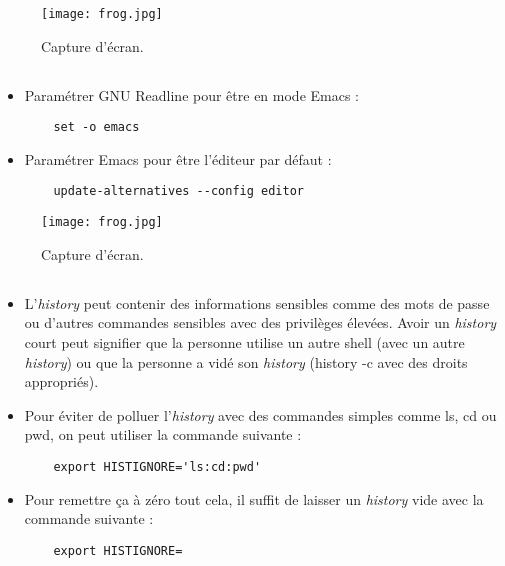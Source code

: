 \documentclass{article}
\begin{document}
\begin{figure}[h]
\centering
\texttt{[image: frog.jpg]}
\caption{\label{fig:frog}Capture d'écran.}
\end{figure}

\subsection{}

\begin{itemize}
    \item Paramétrer GNU Readline pour être en mode Emacs :
    \begin{lstlisting}
    set -o emacs
    \end{lstlisting}
    \item Paramétrer Emacs pour être l’éditeur par défaut :
    \begin{lstlisting}
    update-alternatives --config editor
    \end{lstlisting}
\end{itemize}

\begin{figure}[h]
\centering
\texttt{[image: frog.jpg]}
\caption{\label{fig:frog}Capture d'écran.}
\end{figure}

\subsection{}

\begin{itemize}
    \item L’\emph{history} peut contenir des informations sensibles comme des mots de passe ou d’autres commandes sensibles avec des privilèges élevées. Avoir un \emph{history} court peut signifier que la personne utilise un autre shell (avec un autre \emph{history}) ou que la personne a vidé son \emph{history} (history -c avec des droits appropriés).
    \item Pour éviter de polluer l’\emph{history} avec des commandes simples comme ls, cd ou pwd, on peut utiliser la commande suivante :
    \begin{lstlisting}
    export HISTIGNORE='ls:cd:pwd'
    \end{lstlisting}
    \item Pour remettre ça à zéro tout cela, il suffit de laisser un \emph{history} vide avec la commande suivante :
    \begin{lstlisting}
    export HISTIGNORE=
    \end{lstlisting}
\end{itemize}
\end{document}
